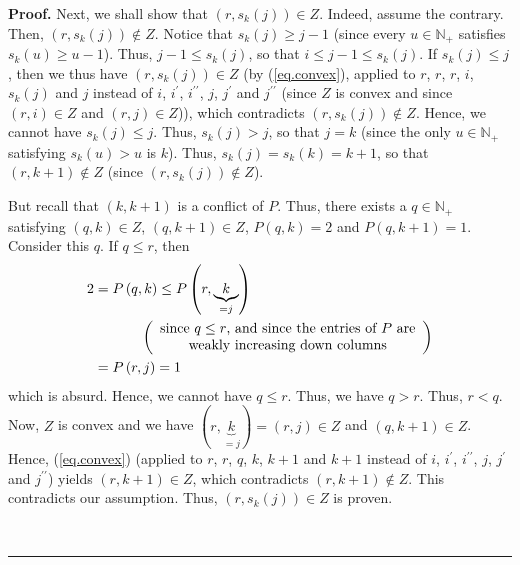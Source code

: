 \documentclass[numbers=enddot,12pt,final,onecolumn,notitlepage]{scrartcl}%
\theoremstyle{definition}
\newenvironment{proof}[1][Proof]{\noindent\textbf{#1.} }{\ \rule{0.5em}{0.5em}}
\begin{document}
\begin{proof}
Next, we shall show that $\left(  r,s_{k}\left(  j\right)  \right)  \in Z$.
Indeed, assume the contrary. Then, $\left(  r,s_{k}\left(  j\right)  \right)
\notin Z$. Notice that $s_{k}\left(  j\right)  \geq j-1$ (since every
$u\in\mathbb{N}_{+}$ satisfies $s_{k}\left(  u\right)  \geq u-1$). Thus,
$j-1\leq s_{k}\left(  j\right)  $, so that $i\leq j-1\leq s_{k}\left(
j\right)  $. If $s_{k}\left(  j\right)  \leq j$, then we thus have $\left(
r,s_{k}\left(  j\right)  \right)  \in Z$ (by (\ref{eq.convex}), applied to
$r$, $r$, $r$, $i$, $s_{k}\left(  j\right)  $ and $j$ instead of $i$,
$i^{\prime}$, $i^{\prime\prime}$, $j$, $j^{\prime}$ and $j^{\prime\prime}$
(since $Z$ is convex and since $\left(  r,i\right)  \in Z$ and $\left(
r,j\right)  \in Z$)), which contradicts $\left(  r,s_{k}\left(  j\right)
\right)  \notin Z$. Hence, we cannot have $s_{k}\left(  j\right)  \leq j$.
Thus, $s_{k}\left(  j\right)  >j$, so that $j=k$ (since the only
$u\in\mathbb{N}_{+}$ satisfying $s_{k}\left(  u\right)  >u$ is $k$). Thus,
$s_{k}\left(  j\right)  =s_{k}\left(  k\right)  =k+1$, so that $\left(
r,k+1\right)  \notin Z$ (since $\left(  r,s_{k}\left(  j\right)  \right)
\notin Z$).

But recall that $\left(  k,k+1\right)  $ is a conflict of $P$. Thus, there
exists a $q\in\mathbb{N}_{+}$ satisfying $\left(  q,k\right)  \in Z$, $\left(
q,k+1\right)  \in Z$, $P\left(  q,k\right)  =2$ and $P\left(  q,k+1\right)
=1$. Consider this $q$. If $q\leq r$, then
\begin{align*}
2  &  =P\left(  q,k\right)  \leq P\left(  r,\underbrace{k}_{=j}\right) \\
&  \ \ \ \ \ \ \ \ \ \ \left(
\begin{array}
[c]{c}%
\text{since }q\leq r\text{, and since the entries of }P\text{ are}\\
\text{weakly increasing down columns}%
\end{array}
\right) \\
&  =P\left(  r,j\right)  =1
\end{align*}
which is absurd. Hence, we cannot have $q\leq r$. Thus, we have $q>r$. Thus,
$r<q$. Now, $Z$ is convex and we have $\left(  r,\underbrace{k}_{=j}\right)
=\left(  r,j\right)  \in Z$ and $\left(  q,k+1\right)  \in Z$. Hence,
(\ref{eq.convex}) (applied to $r$, $r$, $q$, $k$, $k+1$ and $k+1$ instead of
$i$, $i^{\prime}$, $i^{\prime\prime}$, $j$, $j^{\prime}$ and $j^{\prime\prime
}$) yields $\left(  r,k+1\right)  \in Z$, which contradicts $\left(
r,k+1\right)  \notin Z$. This contradicts our assumption. Thus, $\left(
r,s_{k}\left(  j\right)  \right)  \in Z$ is proven.


\end{proof}
\end{document}
